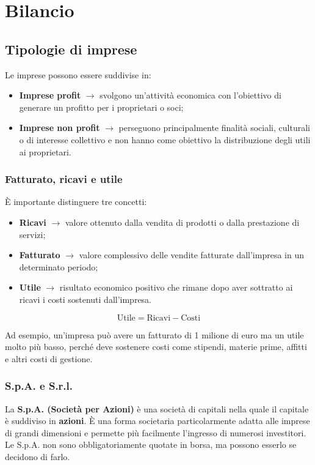 \chapter{Bilancio}
\section{Tipologie di imprese}

Le imprese possono essere suddivise in:
\begin{itemize}
    \item \textbf{Imprese profit} $\rightarrow$ svolgono un'attività economica con l'obiettivo di generare 
    un profitto per i proprietari o soci;
    \item \textbf{Imprese non profit} $\rightarrow$ perseguono principalmente finalità sociali, culturali 
    o di interesse collettivo e non hanno come obiettivo la distribuzione degli utili ai proprietari.
\end{itemize}

\subsection{Fatturato, ricavi e utile}
È importante distinguere tre concetti:
\begin{itemize}
    \item \textbf{Ricavi} $\rightarrow$ valore ottenuto dalla vendita di prodotti o dalla prestazione di servizi;
    \item \textbf{Fatturato} $\rightarrow$ valore complessivo delle vendite fatturate dall'impresa in un 
    determinato periodo;
    \item \textbf{Utile} $\rightarrow$ risultato economico positivo che rimane dopo aver sottratto ai 
    ricavi i costi sostenuti dall'impresa.
\end{itemize}

\[
\text{Utile} = \text{Ricavi} - \text{Costi}
\]

\noindent Ad esempio, un'impresa può avere un fatturato di 1 milione di euro ma un utile molto più basso, 
perché deve sostenere costi come stipendi, materie prime, affitti e altri costi di gestione.

\subsection{S.p.A. e S.r.l.}
La \textbf{S.p.A. (Società per Azioni)} è una società di capitali nella quale il capitale è suddiviso in 
\textbf{azioni}. È una forma societaria particolarmente adatta alle imprese di grandi dimensioni e permette più facilmente l'ingresso di numerosi investitori.
Le S.p.A. non sono obbligatoriamente quotate in borsa, ma possono esserlo se decidono di farlo.

